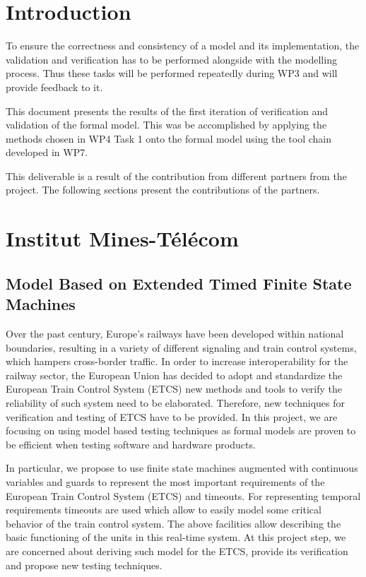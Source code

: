 \documentclass{template/openetcs_article}
\begin{document}



\section*{Introduction}

To ensure the correctness and consistency of a model and its implementation, the validation
and verification has to be performed alongside with the modelling process. Thus these tasks will
be performed repeatedly during WP3 and will provide feedback to it.

This document presents the results of the first iteration of verification and validation of the formal model. This was be accomplished
by applying the methods chosen in WP4 Task 1 onto the formal model using the tool
chain developed in WP7. 

This deliverable is a result of the contribution from different partners from the project. The following sections present the contributions of the partners.

\section{Institut Mines-Télécom}

\subsection{Model Based on Extended Timed Finite State Machines}

Over the past century, Europe's railways have been developed within national boundaries, resulting in a variety of different signaling and train control systems, which hampers cross-border traffic. In order to increase interoperability for the railway sector, the European Union has decided to adopt and standardize the European Train Control System (ETCS) new methods and tools to verify the reliability of such system need to be elaborated. Therefore, new techniques for verification and testing of ETCS have to be provided. In this project, we are focusing on using model based testing techniques as formal models are proven to be efficient when testing software and hardware products.
  
In particular, we propose to use finite state machines augmented with continuous variables and guards to represent the most important requirements of the European Train Control System (ETCS) and timeouts. For representing temporal requirements timeouts are used which allow to easily model some critical behavior of the train control system. The above facilities allow describing the basic functioning of the units in this real-time system. At this project step, we are concerned about deriving such model for the ETCS, provide its verification and propose new testing techniques.
\end{document}
